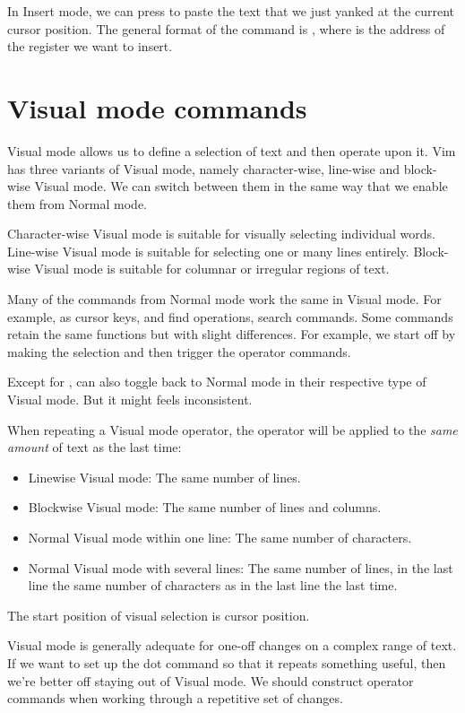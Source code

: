 \documentclass{article}
\newcommand{\syntax}[1]{\PVerb{#1}}
\begin{document}
In Insert mode, we can press \syntax{<C-r>0} to paste the text that we just yanked at the current cursor position. The general format of the command is \syntax{<C-r>{register}}, where \syntax{{register}} is the address of the register we want to insert.

\section{Visual mode commands}
Visual mode allows us to define a selection of text and then operate upon it.
Vim has three variants of Visual mode, namely character-wise, line-wise and block-wise Visual mode. We can switch between them in the same way that we enable them from Normal mode.

Character-wise Visual mode is suitable for visually selecting individual words. Line-wise Visual mode is suitable for selecting one or many lines entirely. Block-wise Visual mode is suitable for columnar or irregular regions of text.

Many of the commands from Normal mode work the same in Visual mode.
For example, \syntax{h,j,k,l} as cursor keys, \syntax{f{char}} and \syntax{;/,} find operations, \syntax{/,n,N} search commands.
Some commands retain the same functions but with slight differences.
For example, we start off by making the selection and then trigger the operator commands.

Except for \syntax{<Esc>}, \syntax{v,V,<C-v>} can also toggle back to Normal mode in their respective type of Visual mode. But it might feels inconsistent.


When repeating a Visual mode operator, the operator will be applied to the
\emph{same amount} of text as the last time:
\begin{itemize}
  \item Linewise Visual mode: The same number of lines.
  \item Blockwise Visual mode: The same number of lines and columns.
  \item Normal Visual mode within one line: The same number of characters.
  \item Normal Visual mode with several lines: The same number of lines, in the last line the same number of characters as in the last line the last time.
\end{itemize}
The start position of visual selection is cursor position.

Visual mode is generally adequate for one-off changes on a complex range of text. If we want to set up the dot command so that it repeats something useful, then we're better off staying out of Visual mode. We should construct operator commands when working through a repetitive set of changes.
\end{document}
